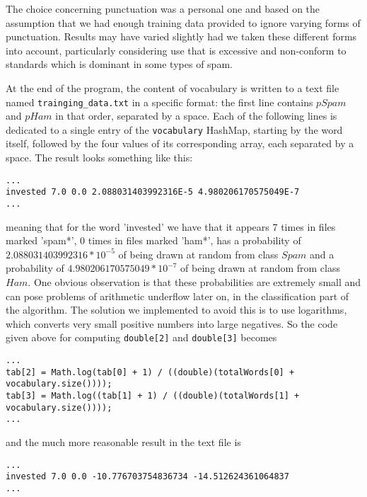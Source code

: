 \documentclass[12pt,a4paper]{report}
\begin{document}
The choice concerning punctuation was a personal one and based on the assumption that we had enough training data provided to ignore varying forms of punctuation. Results may have varied slightly had we taken these different forms into account, particularly considering use that is excessive and non-conform to standards which is dominant in some types of spam.

At the end of the program, the content of vocabulary is written to a text file named \texttt{trainging\_data.txt} in a specific format: the first line contains $pSpam$ and $pHam$ in that order, separated by a space. Each of the following lines is dedicated to a single entry of the \texttt{vocabulary} HashMap, starting by the word itself, followed by the four values of its corresponding array, each separated by a space. The result looks something like this: 
\begin{lstlisting}
...
invested 7.0 0.0 2.088031403992316E-5 4.980206170575049E-7 
...
\end{lstlisting}
meaning that for the word 'invested' we have that it appears 7 times in files marked 'spam*', 0 times in files marked 'ham*', has a probability of $2.088031403992316 * 10^{-5}$ of being drawn at random from class $Spam$ and a probability of $4.980206170575049 * 10^{-7}$ of being drawn at random from class $Ham$. One obvious observation is that these probabilities are extremely small and can pose problems of arithmetic underflow later on, in the classification part of the algorithm. The solution we implemented to avoid this is to use logarithms, which converts very small positive numbers into large negatives. So the code given above for computing \texttt{double[2]} and \texttt{double[3]} becomes 

\begin{lstlisting}
...
tab[2] = Math.log(tab[0] + 1) / ((double)(totalWords[0] + vocabulary.size())));
tab[3] = Math.log((tab[1] + 1) / ((double)(totalWords[1] + vocabulary.size())));
...
\end{lstlisting}

and the much more reasonable result in the text file is

\begin{lstlisting}
...
invested 7.0 0.0 -10.776703754836734 -14.512624361064837 
...
\end{lstlisting}
\end{document}
